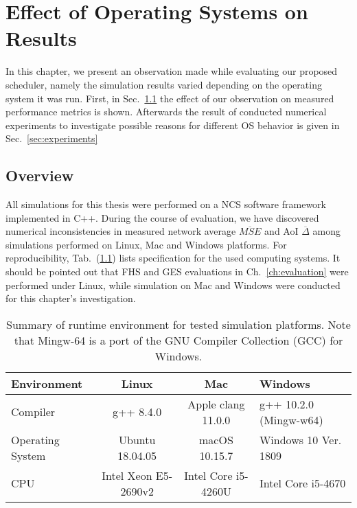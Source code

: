 \chapter{Effect of Operating Systems on Results}

In this chapter, we present an observation made while evaluating our proposed
scheduler, namely the simulation results varied depending on the operating
system it was run. First, in Sec.~\ref{sec:effect} the effect of our observation
on measured performance metrics is shown. Afterwards the result of conducted
numerical experiments to investigate possible reasons for different OS behavior
is given in Sec.~\ref{sec:experiments}

\section{Overview} \label{sec:effect}

All simulations for this thesis were performed on a NCS software framework
implemented in C++\footnotemark. During the course of evaluation, we have
discovered numerical inconsistencies in measured network average
$\overline{MSE}$ and AoI $\overline{\Delta}$ among simulations performed on
Linux, Mac and Windows platforms. For reproducibility, Tab.~(\ref{tab:specs})
lists specification for the used computing systems. It should be pointed out
that FHS and GES evaluations in Ch.~\ref{ch:evaluation} were performed under
Linux, while simulation on Mac and Windows were conducted for this chapter's
investigation.

\begin{table}[b]
  \begin{center}
  \begin{tabular}{|l|c|c|>{\centering\arraybackslash}p{3.4cm}|} 
  \hline
  \textbf{Environment} & \textbf{Linux} & \textbf{Mac} & \textbf{Windows} \\
  \hline \hline
  Compiler & g++ 8.4.0 & Apple clang 11.0.0 & g++ 10.2.0 (Mingw-w64) \\ 
  Operating System & Ubuntu 18.04.05 & macOS 10.15.7 & Windows 10 Ver. 1809 \\ 
  CPU & Intel Xeon E5-2690v2 & Intel Core i5-4260U & Intel Core i5-4670 \\
  \hline
  \end{tabular}
  \caption[Summary of runtime environment for tested simulation
  platforms]{Summary of runtime environment for tested simulation platforms.
  Note that Mingw-64 is a port of the GNU Compiler Collection (GCC) for
  Windows.}
  \label{tab:specs}
  \end{center}
\end{table}

